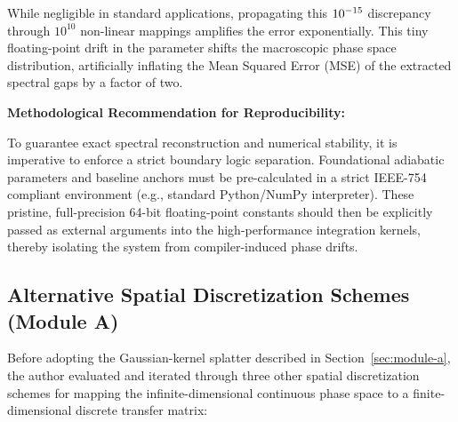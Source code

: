 \documentclass[mca,article,submit,oneauthor,pdftex]{Definitions/mdpi}
\begin{document}
While negligible in standard applications, propagating this
\(\text{10}^{\text{\ensuremath{-}15}}\) discrepancy through \(\text{10}^{\text{10}}\)
non-linear mappings amplifies the error exponentially. This tiny
floating-point drift in the parameter shifts the macroscopic phase
space distribution, artificially inflating the Mean Squared Error (MSE)
of the extracted spectral gaps by a factor of two.

\textbf{Methodological Recommendation for Reproducibility:}

To guarantee exact spectral reconstruction and numerical stability, it
is imperative to enforce a strict boundary logic separation.
Foundational adiabatic parameters and baseline anchors must be
pre-calculated in a strict IEEE-754 compliant environment (e.g.,
standard Python/NumPy interpreter). These pristine, full-precision
64-bit floating-point constants should then be explicitly passed as
external arguments into the high-performance integration kernels,
thereby isolating the system from compiler-induced phase drifts.

\subsection{Alternative Spatial Discretization Schemes (Module A)}\label{sec:module-a-alternatives}

Before adopting the Gaussian-kernel splatter described in
Section~\ref{sec:module-a}, the author evaluated and iterated through three
other spatial discretization schemes for mapping the infinite-dimensional
continuous phase space to a finite-dimensional discrete transfer matrix:
\end{document}
